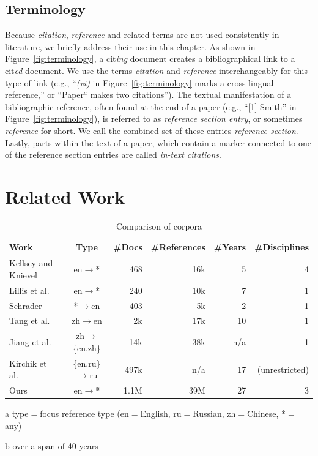 \subsection*{Terminology}
Because \textit{citation}, \textit{reference} and related terms are not used consistently in literature, we briefly address their use in this chapter. As shown in Figure~\ref{fig:terminology}, a cit\emph{ing} document creates a bibliographical link to a cit\emph{ed} document. We use the terms \textit{citation} and \textit{reference} interchangeably for this type of link (e.g., ``\textit{(vi)} in Figure~\ref{fig:terminology} marks a cross-lingual reference,'' or ``Paper$^a$ makes two citations''). The textual manifestation of a bibliographic reference, often found at the end of a paper (e.g., ``[1] Smith'' in Figure~\ref{fig:terminology}), is referred to as \textit{reference section entry}, or sometimes \textit{reference} for short. We call the combined set of these entries \textit{reference section}. Lastly, parts within the text of a paper, which contain a marker connected to one of the reference section entries are called \textit{in-text citations}.

\section{Related Work}\label{sec:relwork}

\begin{table}
\caption{Comparison of corpora}
 \label{tab:relworkcomp}
  \centering
  \begin{small}
 \begin{threeparttable}
 \begin{tabular}{lcrrrr}
 \toprule
   Work & Type\tnote{a} & \#Docs & \hphantom{m}\#References & \hphantom{m}\#Years & \hphantom{nn}\#Disciplines \\
   \midrule
   Kellsey and Knievel~\cite{Kellsey2004} & en$\rightarrow$* & 468 & 16k & 5\tnote{b} & 4 \\
   Lillis et al.~\cite{Lillis2010} & en$\rightarrow$* & 240 & 10k & 7 & 1 \\
   Schrader~\cite{Schrader2019} & *$\rightarrow$en & 403 & 5k & 2 & 1 \\
   Tang et al.~\cite{Tang2014} & zh$\rightarrow$en & 2k & 17k & 10 & 1 \\
   Jiang et al.~\cite{Jiang2018,Jiang2018b} & zh$\rightarrow$\{en,zh\} & 14k & 38k & n/a & 1 \\
   Kirchik et al.~\cite{Kirchik2012} & \{en,ru\}$\rightarrow$ru & 497k & n/a & 17 & (unrestricted) \\
   Ours & en$\rightarrow$* &  1.1M & 39M & 27 & 3 \\
   \bottomrule
 \end{tabular}
 \begin{tablenotes}
    \item[a] type$=$focus reference type (en$=$English, ru$=$Russian, zh$=$Chinese, *$=$any)
    \item[b] over a span of 40 years
 \end{tablenotes}
\end{threeparttable}
  \end{small}
\end{table}

